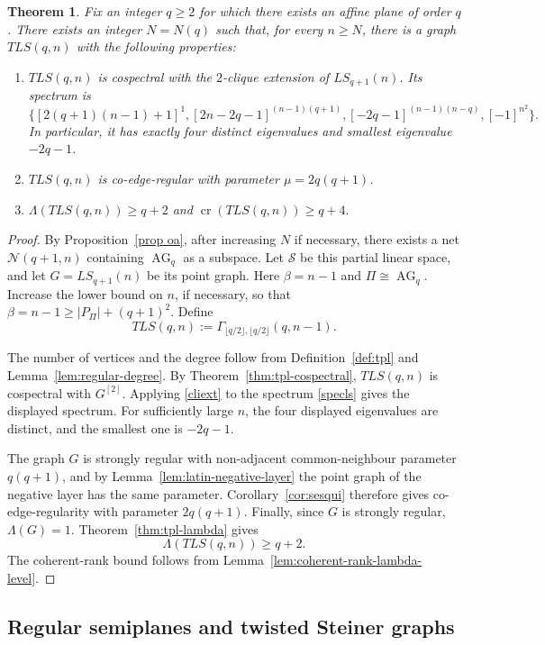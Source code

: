 \documentclass[reqno,a4paper,11pt]{article}
\newtheorem{thm}{Theorem}[section]
\theoremstyle{definition}
\theoremstyle{remark}
\newcommand{\AG}{\operatorname{AG}}
\begin{document}
\begin{thm}\label{thm:latin-application}
Fix an integer \(q\ge2\) for which there exists an affine plane of order \(q\).  There exists an integer $N=N(q)$ such that, for every $n\ge N$, there is a graph $TLS(q,n)$ with the following properties:
\begin{enumerate}[label=\textup{(\roman*)}]
\item $TLS(q,n)$ is cospectral with the $2$-clique extension of $LS_{q+1}(n)$.
Its spectrum is
\[
\{[2(q+1)(n-1)+1]^1,
[2n-2q-1]^{(n-1)(q+1)},
[-2q-1]^{(n-1)(n-q)},
[-1]^{n^2}\}.
\]
In particular, it has exactly four distinct eigenvalues and smallest eigenvalue $-2q-1$.
\item $TLS(q,n)$ is co-edge-regular with parameter $\mu=2q(q+1)$.
\item
$
\Lambda(TLS(q,n))\ge q+2$ and $
\operatorname{cr}(TLS(q,n))\ge q+4.$
\end{enumerate}
\end{thm}

\begin{proof}
By Proposition~\ref{prop oa}, after increasing
\(N\) if necessary, there exists a net \(\mathcal N(q+1,n)\) containing
\(\AG_q\) as a subspace.  Let \(\mathcal S\) be this partial linear space,
and let \(G=LS_{q+1}(n)\) be its point graph.
Here $\beta=n-1$ and $\Pi\cong\AG_q$.
Increase the lower bound on $n$, if necessary, so that
$\beta=n-1\ge |P_\Pi|+(q+1)^2.$
Define
\[
TLS(q,n):=\Gamma_{\lfloor q/2\rfloor,\lfloor q/2\rfloor}(q,n-1).
\]

The number of vertices and the degree follow from Definition~\ref{def:tpl} and Lemma~\ref{lem:regular-degree}.
By Theorem~\ref{thm:tpl-cospectral}, $TLS(q,n)$ is cospectral with $G^{[2]}$.
Applying \eqref{cliext} to the spectrum \eqref{specls} gives the displayed spectrum.
For sufficiently large $n$, the four displayed eigenvalues are distinct, and the smallest one is $-2q-1$.

The graph $G$ is strongly regular with non-adjacent common-neighbour parameter $q(q+1)$, and by Lemma~\ref{lem:latin-negative-layer} the point graph of the negative layer has the same parameter.
Corollary~\ref{cor:sesqui} therefore gives co-edge-regularity with parameter $2q(q+1)$.
Finally, since $G$ is strongly regular, $\Lambda(G)=1$.
Theorem~\ref{thm:tpl-lambda} gives
\[
\Lambda(TLS(q,n))\ge q+2.
\]
The coherent-rank bound follows from Lemma~\ref{lem:coherent-rank-lambda-level}.
\end{proof}

\subsection{Regular semiplanes and twisted Steiner graphs}\label{st}
\end{document}
